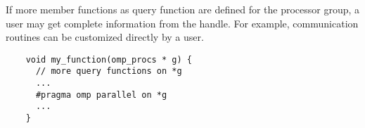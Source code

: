 
If more member functions as query function are defined for the processor group,
a user may get complete information from the handle. For example,
communication routines can be customized directly by a user.

{\footnotesize
\begin{verbatim}
    void my_function(omp_procs * g) {
      // more query functions on *g
      ...
      #pragma omp parallel on *g
      ...
    }
\end{verbatim}
}

%
%
%
%
